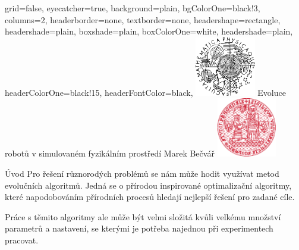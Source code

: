 \documentclass[portrait,a0paper,fontscale=0.25]{baposter}
\begin{document}
\color{black!80} %
\begin{poster}{grid=false,
	eyecatcher=true,
	background=plain,
	bgColorOne=black!3, %
	columns=2,
	headerborder=none,
	textborder=none,
	headershape=rectangle,
	headershade=plain,
	boxshade=plain,
	boxColorOne=white,
	headershade=plain,
	headerColorOne=black!15, %
	headerFontColor=black,
	}%
	{\includegraphics[height=7em]{logos/mff-black.pdf}}
    {Evoluce robotů v simulovaném\vspace*{4px} fyzikálním prostředí}
	{\vspace{1ex} Marek Bečvář}
	{\includegraphics[height=7em]{logos/uk-red.pdf}}


%
%

\begin{posterbox}[column=0,name=uvod]{Úvod}
Pro řešení různorodých problémů se nám může hodit využívat metod evolučních
algoritmů. Jedná se o přírodou inspirované optimalizační algoritmy, které
napodobováním přírodních procesů hledají nejlepší řešení pro zadané cíle.

Práce s těmito algoritmy ale může být velmi složitá kvůli velkému množství
parametrů a nastavení, se kterými je potřeba najednou při experimentech
pracovat.

\end{posterbox}


\end{poster}
\end{document}
